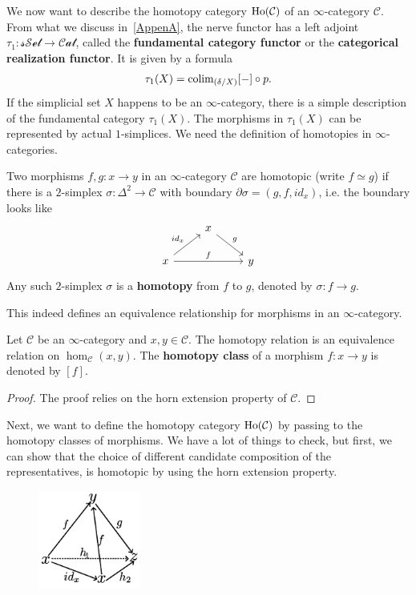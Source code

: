 We now want to describe the homotopy category \(\text{Ho}(\mathcal{C})\) of an \(\infty\)-category \(\mathcal{C}\). From what we discuss in~\ref{AppenA}, the nerve functor has a left adjoint \(\tau_1:\mathcal{sSet}\rightarrow \mathcal{Cat}\), called the \textbf{fundamental category functor} or the \textbf{categorical realization functor}. It is given by a formula 
\[\tau_1(X)=\text{colim}_{(\delta/X)}[-]\circ p.\]
If the simplicial set \(X\) happens to be an \(\infty\)-category, there is a simple description of the fundamental category \(\tau_1(X)\). The morphisms in \(\tau_1(X)\) can be represented by actual \(1\)-simplices. We need the definition of homotopies in \(\infty\)-categories.
\begin{definition}[homotopy]
     Two morphisms \(f,g:x\rightarrow y\) in an \(\infty\)-category \(\mathcal{C}\) are homotopic (write \(f\simeq g\)) if there is a \(2\)-simplex \(\sigma:\Delta^2\rightarrow \mathcal{C}\) with boundary \(\partial \sigma=(g,f,id_x)\), i.e. the boundary looks like 
     \[\begin{tikzcd}
             & x \\
             x && y
             \arrow["g", from=1-2, to=2-3]
             \arrow["{id_x}", from=2-1, to=1-2]
             \arrow["f", from=2-1, to=2-3]
         \end{tikzcd}\]
    Any such \(2\)-simplex \(\sigma\) is a \textbf{homotopy} from \(f\) to \(g\), denoted by \(\sigma:f\rightarrow g\). 
\end{definition}
This indeed defines an equivalence relationship for morphisms in an \(\infty\)-category.
\begin{proposition}     
     Let \(\mathcal{C}\) be an \(\infty\)-category and \(x,y\in \mathcal{C}\). The homotopy relation is an equivalence relation on \(\hom_\mathcal{C}(x,y)\). The \textbf{homotopy class} of a morphism \(f:x\rightarrow y\) is denoted by \([f]\).
\end{proposition}
\begin{proof}
    The proof relies on the horn extension property of \(\mathcal{C}\).
\end{proof}

Next, we want to define the homotopy category \(\text{Ho}(\mathcal{C})\) by passing to the homotopy classes of morphisms. We have a lot of things to check, but first, we can show that the choice of different candidate composition of the representatives, is homotopic by using the horn extension property.
\begin{figure}[h]
    \centering
    \includegraphics[width=0.3\textwidth]{tetra3.jpg}
\end{figure}


